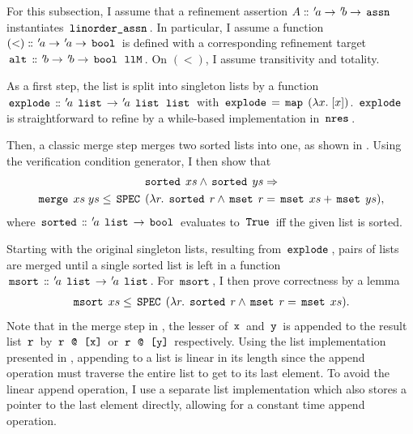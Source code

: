 For this subsection, I assume that a refinement assertion $A \mathrel{\mathord{:}\mkern-1.2mu\mathord{:}} {\mskip2mu '\mskip-2mua} \rightarrow {\mskip2mu '\mskip-2mub} \rightarrow \,\text{\ttfamily assn}\,$ instantiates $\,\text{\ttfamily linorder\_assn}\,$.
In particular, I assume a function $(<) \mathrel{\mathord{:}\mkern-1.2mu\mathord{:}} {\mskip2mu '\mskip-2mua} \rightarrow {\mskip2mu '\mskip-2mua} \rightarrow \,\text{\ttfamily bool}\,$ is defined with a corresponding refinement target $\,\text{\ttfamily alt}\, \mathrel{\mathord{:}\mkern-1.2mu\mathord{:}} {\mskip2mu '\mskip-2mub} \rightarrow {\mskip2mu '\mskip-2mub} \rightarrow \,\text{\ttfamily bool}\, \; \,\text{\ttfamily llM}\,$.
On $(<)$, I assume transitivity and totality.

As a first step, the list is split into singleton lists by a function $\,\text{\ttfamily explode}\, \mathrel{\mathord{:}\mkern-1.2mu\mathord{:}} {\mskip2mu '\mskip-2mua} \; \,\text{\ttfamily list}\, \rightarrow {\mskip2mu '\mskip-2mua} \; \,\text{\ttfamily list}\, \; \,\text{\ttfamily list}\,$ with $\,\text{\ttfamily explode}\, = \,\text{\ttfamily map}\, \; (\lambda x. \; [x])$.
$\,\text{\ttfamily explode}\,$ is straightforward to refine by a while-based implementation in $\,\text{\ttfamily nres}\,$.

Then, a classic merge step merges two sorted lists into one, as shown in .
Using the  verification condition generator, I then show that
\begin{gather*}
	\,\text{\ttfamily sorted}\, \; xs \land \,\text{\ttfamily sorted}\, \; ys \Rightarrow \\
	\,\text{\ttfamily merge}\, \; xs \; ys \le \,\text{\ttfamily SPEC}\, \; (\lambda r. \; \,\text{\ttfamily sorted}\, \; r \land \,\text{\ttfamily mset}\, \; r = \,\text{\ttfamily mset}\, \; xs + \,\text{\ttfamily mset}\, \; ys),
\end{gather*}
where $\,\text{\ttfamily sorted}\, \mathrel{\mathord{:}\mkern-1.2mu\mathord{:}} {\mskip2mu '\mskip-2mua} \; \,\text{\ttfamily list}\, \rightarrow \,\text{\ttfamily bool}\,$ evaluates to $\,\text{\ttfamily True}\,$ iff the given list is sorted.

Starting with the original singleton lists, resulting from $\,\text{\ttfamily explode}\,$, pairs of lists are merged until a single sorted list is left in a function $\,\text{\ttfamily msort}\, \mathrel{\mathord{:}\mkern-1.2mu\mathord{:}} {\mskip2mu '\mskip-2mua} \; \,\text{\ttfamily list}\, \rightarrow {\mskip2mu '\mskip-2mua} \; \,\text{\ttfamily list}\,$.
For $\,\text{\ttfamily msort}\,$, I then prove correctness by a lemma
\begin{gather*}
	\,\text{\ttfamily msort}\, \; xs \le \,\text{\ttfamily SPEC}\, \; (\lambda r. \; \,\text{\ttfamily sorted}\, \; r \land \,\text{\ttfamily mset}\, \; r = \,\text{\ttfamily mset}\, \; xs).
\end{gather*}
Note that in the merge step in , the lesser of $\,\text{\ttfamily x}\,$ and $\,\text{\ttfamily y}\,$ is appended to the result list $\,\text{\ttfamily r}\,$ by $\,\text{\ttfamily r}\, \; \,\text{\ttfamily @}\, \; \,\text{\ttfamily [x]}\,$ or $\,\text{\ttfamily r}\, \; \,\text{\ttfamily @}\, \; \,\text{\ttfamily [y]}\,$ respectively.
Using the list implementation presented in , appending to a list is linear in its length since the append operation must traverse the entire list to get to its last element.
To avoid the linear append operation, I use a separate list implementation which also stores a pointer to the last element directly, allowing for a constant time append operation.

